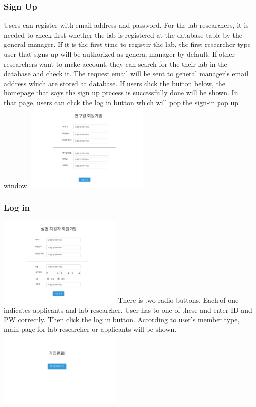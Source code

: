 \documentclass[letterpaper, 10 pt, conference]{ieeeconf}  %
\begin{document}
\subsubsection{Sign Up}
Users can register with email address and password. For the lab researchers, it is needed to check first whether the lab is registered at the database table by the general manager. If it is the first time to register the lab, the first researcher type user that signs up will be authorized as general manager by default. If other researchers want to make account, they can search for the their lab in the database and check it. The request email will be sent to general manager's email address which are stored at database. 
If users click the button below, the homepage that says the sign up process is successfully done will be shown. In that page, users can click the log in button which will pop the sign-in pop up window.
\includegraphics[width=6cm]{Oven/04_labSignup.jpg}
\subsubsection{Log in}
\includegraphics[width=6cm]{Oven/03_applicantSignup.jpg}
There is two radio buttons. Each of one indicates applicants and lab researcher. User has to one of these and enter ID and PW correctly. Then click the log in button. According to user's member type, main page for lab researcher or applicants will be shown.
\includegraphics[width=6cm]{Oven/05_signupCompleted.jpg}
\end{document}
